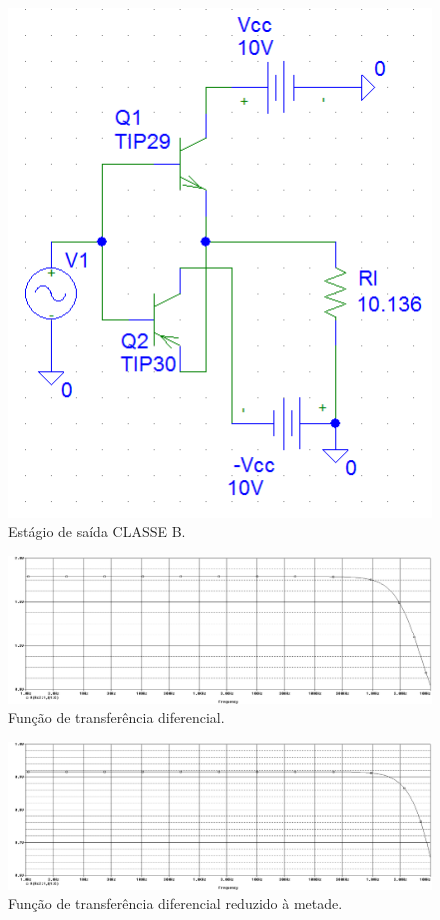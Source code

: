 \documentclass[12pt, a4paper]{article}
\begin{document}
    \newpage
    
    
    \begin{figure}[h!] 
        \centering
        \includegraphics[width=0.40\textheight]{circ42}
        \caption{Estágio de saída CLASSE B.}        
        \label{circ42}
    \end{figure}
    

    \newpage
    
    \begin{figure}[h!] 
        \centering
        \includegraphics[width=1\textheight, angle=-90]{graf411}
        \caption{Função de transferência diferencial.}        
        \label{graf411}
    \end{figure}
    
    \newpage
    
    \begin{figure}[h!] 
        \centering
        \includegraphics[width=1\textheight, angle=-90]{graf412}
        \caption{Função de transferência diferencial reduzido à metade.}        
        \label{graf412}
    \end{figure}
\end{document}
